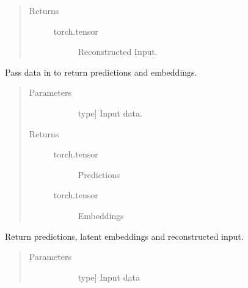 \documentclass[letterpaper,10pt,english]{sphinxmanual}
\begin{document}
\begin{fulllineitems}
\begin{fulllineitems}
\begin{quote}
\begin{description}
\item[{Returns}] \leavevmode\begin{description}
\item[{torch.tensor}] \leavevmode
Reconstructed Input.

\end{description}

\end{description}\end{quote}

\end{fulllineitems}


\begin{fulllineitems}
\label{\detokenize{index:methylnet.models.VAE_MLP.forward}}
Pass data in to return predictions and embeddings.
\begin{quote}\begin{description}
\item[{Parameters}] \leavevmode\begin{description}
\item[{}] \leavevmode{[}type{]}
Input data.

\end{description}

\item[{Returns}] \leavevmode\begin{description}
\item[{torch.tensor}] \leavevmode
Predictions

\item[{torch.tensor}] \leavevmode
Embeddings

\end{description}

\end{description}\end{quote}

\end{fulllineitems}


\begin{fulllineitems}
\label{\detokenize{index:methylnet.models.VAE_MLP.forward_embed}}
Return predictions, latent embeddings and reconstructed input.
\begin{quote}\begin{description}
\item[{Parameters}] \leavevmode\begin{description}
\item[{}] \leavevmode{[}type{]}
Input data


\end{description}
\end{description}
\end{quote}
\end{fulllineitems}
\end{fulllineitems}
\end{document}
